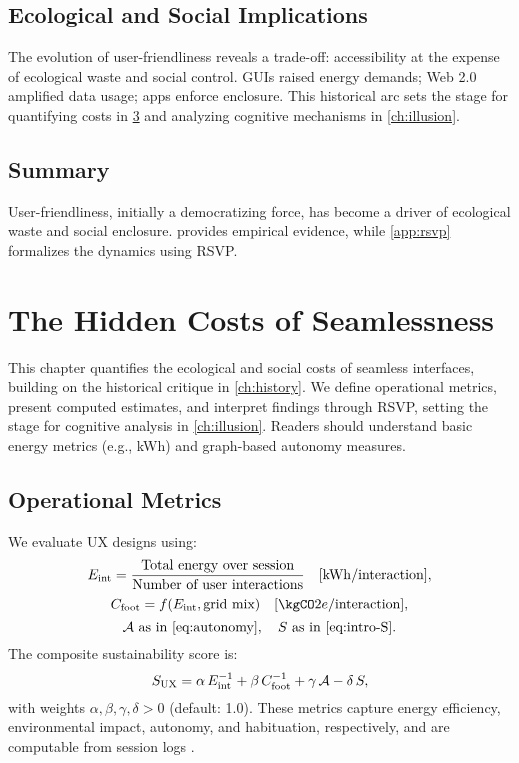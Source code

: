 \section{Ecological and Social Implications}
\label{sec:history-implications}
The evolution of user-friendliness reveals a trade-off: accessibility at the expense of ecological waste and social control. GUIs raised energy demands; Web 2.0 amplified data usage; apps enforce enclosure. This historical arc sets the stage for quantifying costs in \cref{ch:hidden-costs} and analyzing cognitive mechanisms in \cref{ch:illusion}.

\section{Summary}
User-friendliness, initially a democratizing force, has become a driver of ecological waste and social enclosure.  provides empirical evidence, while \cref{app:rsvp} formalizes the dynamics using RSVP.

\chapter{The Hidden Costs of Seamlessness}
\label{ch:hidden-costs}

This chapter quantifies the ecological and social costs of seamless interfaces, building on the historical critique in \cref{ch:history}. We define operational metrics, present computed estimates, and interpret findings through RSVP, setting the stage for cognitive analysis in \cref{ch:illusion}. Readers should understand basic energy metrics (e.g., kWh) and graph-based autonomy measures.

\section{Operational Metrics}
\label{sec:metrics-def}
We evaluate UX designs using:
\begin{equation}
E_{\mathrm{int}} = \frac{\text{Total energy over session}}{\text{Number of user interactions}} \quad [\mathrm{kWh}/\text{interaction}],
\end{equation}
\begin{equation}
\Cfoot = f(\Eint, \text{grid mix}) \quad [\kgCO2e/\text{interaction}],
\end{equation}
\begin{equation}
\Auton \text{ as in \cref{eq:autonomy}}, \quad \Sent \text{ as in \cref{eq:intro-S}}.
\end{equation}
The composite sustainability score is:
\begin{equation}
\label{eq:SUX}
S_{\mathrm{UX}} = \alpha\,E_{\mathrm{int}}^{-1} + \beta\,C_{\mathrm{foot}}^{-1} + \gamma\,\mathcal{A} - \delta\,S,
\end{equation}
with weights \(\alpha, \beta, \gamma, \delta > 0\) (default: 1.0). These metrics capture energy efficiency, environmental impact, autonomy, and habituation, respectively, and are computable from session logs \citep{extentia2024}.

